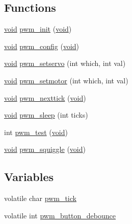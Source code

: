 \subsection*{Functions}
\begin{DoxyCompactItemize}
\item 
\hyperlink{usb__devapi_8h_afabf60e7f57651d6d595a02c75f07cd0}{void} \hyperlink{group___p_w_m_ga1e8fdae3fd7118582ffa427dad05b6e1}{pwm\+\_\+init} (\hyperlink{usb__devapi_8h_afabf60e7f57651d6d595a02c75f07cd0}{void})
\item 
\hyperlink{usb__devapi_8h_afabf60e7f57651d6d595a02c75f07cd0}{void} \hyperlink{group___p_w_m_ga5047a45bb0e8e868a84cbe6c6d5f8ec8}{pwm\+\_\+config} (\hyperlink{usb__devapi_8h_afabf60e7f57651d6d595a02c75f07cd0}{void})
\item 
\hyperlink{usb__devapi_8h_afabf60e7f57651d6d595a02c75f07cd0}{void} \hyperlink{group___p_w_m_ga1007676a796e66917174f4aae48672a4}{pwm\+\_\+setservo} (int which, int val)
\item 
\hyperlink{usb__devapi_8h_afabf60e7f57651d6d595a02c75f07cd0}{void} \hyperlink{group___p_w_m_ga273dc39cb6630062cb86ca6dcd38c1f9}{pwm\+\_\+setmotor} (int which, int val)
\item 
\hyperlink{usb__devapi_8h_afabf60e7f57651d6d595a02c75f07cd0}{void} \hyperlink{group___p_w_m_ga2fbeacc158dbff42bb85bfa3bcac0f21}{pwm\+\_\+nexttick} (\hyperlink{usb__devapi_8h_afabf60e7f57651d6d595a02c75f07cd0}{void})
\item 
\hyperlink{usb__devapi_8h_afabf60e7f57651d6d595a02c75f07cd0}{void} \hyperlink{group___p_w_m_gaec0e6063a08c462c71a366b64ee2947f}{pwm\+\_\+sleep} (int ticks)
\item 
int \hyperlink{group___p_w_m_ga34e9c25fc21fdabeafb7fcfa033be383}{pwm\+\_\+test} (\hyperlink{usb__devapi_8h_afabf60e7f57651d6d595a02c75f07cd0}{void})
\item 
\hyperlink{usb__devapi_8h_afabf60e7f57651d6d595a02c75f07cd0}{void} \hyperlink{group___p_w_m_ga769007174508dba2248cdc0a66e888fa}{pwm\+\_\+squiggle} (\hyperlink{usb__devapi_8h_afabf60e7f57651d6d595a02c75f07cd0}{void})
\end{DoxyCompactItemize}
\subsection*{Variables}
\begin{DoxyCompactItemize}
\item 
volatile char \hyperlink{group___p_w_m_ga354856dbd0205dcf3768b19da8f692d9}{pwm\+\_\+tick}
\item 
volatile int \hyperlink{group___p_w_m_ga9e95213338963b42b5a83712d32d3828}{pwm\+\_\+button\+\_\+debounce}
\end{DoxyCompactItemize}



